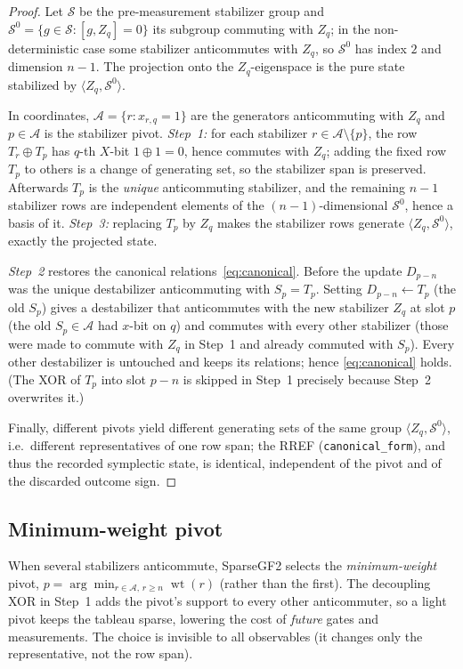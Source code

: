 \documentclass[11pt]{article}
\theoremstyle{definition}
\theoremstyle{plain}
\newcommand{\wt}{\operatorname{wt}}
\newcommand{\code}{\textsf{\small SparseGF2}}
\begin{document}
\begin{proof}
Let $\mathcal{S}$ be the pre-measurement stabilizer group and
$\mathcal{S}^0=\{g\in\mathcal{S}:[g,Z_q]=0\}$ its subgroup commuting with $Z_q$;
in the non-deterministic case some stabilizer anticommutes with $Z_q$, so
$\mathcal{S}^0$ has index $2$ and dimension $n-1$. The projection onto the
$Z_q$-eigenspace is the pure state stabilized by
$\langle Z_q,\mathcal{S}^0\rangle$.

In coordinates, $\mathcal{A}=\{r:x_{r,q}=1\}$ are the generators anticommuting
with $Z_q$ and $p\in\mathcal{A}$ is the stabilizer pivot. \emph{Step~1:} for
each stabilizer $r\in\mathcal{A}\setminus\{p\}$, the row $T_r\oplus T_p$ has
$q$-th $X$-bit $1\oplus1=0$, hence commutes with $Z_q$; adding the fixed row
$T_p$ to others is a change of generating set, so the stabilizer span is
preserved. Afterwards $T_p$ is the \emph{unique} anticommuting stabilizer, and
the remaining $n-1$ stabilizer rows are independent elements of the
$(n-1)$-dimensional $\mathcal{S}^0$, hence a basis of it. \emph{Step~3:}
replacing $T_p$ by $Z_q$ makes the stabilizer rows generate
$\langle Z_q,\mathcal{S}^0\rangle$, exactly the projected state.

\emph{Step~2} restores the canonical relations~\eqref{eq:canonical}. Before the
update $D_{p-n}$ was the unique destabilizer anticommuting with $S_p=T_p$.
Setting $D_{p-n}\leftarrow T_p$ (the old $S_p$) gives a destabilizer that
anticommutes with the new stabilizer $Z_q$ at slot $p$ (the old $S_p\in\mathcal A$
had $x$-bit on $q$) and commutes with every other stabilizer (those were made to
commute with $Z_q$ in Step~1 and already commuted with $S_p$). Every other
destabilizer is untouched and keeps its relations; hence \eqref{eq:canonical}
holds. (The XOR of $T_p$ into slot $p-n$ is skipped in Step~1 precisely because
Step~2 overwrites it.)

Finally, different pivots yield different generating sets of the same group
$\langle Z_q,\mathcal{S}^0\rangle$, i.e.\ different representatives of one row
span; the RREF (\texttt{canonical\_form}), and thus the recorded symplectic
state, is identical, independent of the pivot and of the discarded outcome
sign.
\end{proof}

\subsection{Minimum-weight pivot}
\label{sec:minweight}
When several stabilizers anticommute, \code{} selects the \emph{minimum-weight}
pivot, $p=\arg\min_{r\in\mathcal{A},\,r\ge n}\wt(r)$ (rather than the first).
The decoupling XOR in Step~1 adds the pivot's support to every other
anticommuter, so a light pivot keeps the tableau sparse, lowering the cost of
\emph{future} gates and measurements. The choice is invisible to all observables
(it changes only the representative, not the row span).
\end{document}
